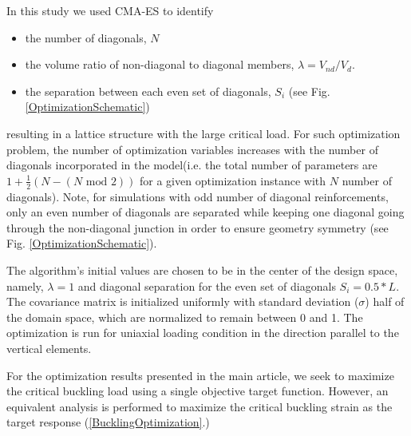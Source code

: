 \documentclass[10pt,twoside]{fernandes_supp}
\begin{document}
In this study we used CMA-ES to identify \begin{itemize} 
\item the number of diagonals, $N$
\item the volume ratio  of non-diagonal to diagonal members, $\lambda=V_{nd}/V_{d}$.
\item  the separation between each even set of diagonals, $S_i$ (see Fig. \ref{OptimizationSchematic})
\end{itemize}
resulting in a lattice structure with the large critical load. For such optimization problem, the number of optimization variables increases with the number of diagonals incorporated in the model(i.e. the total number of parameters are $1+ \frac{1}{2}(N - (N \text{ mod } 2))$ for a given optimization instance with $N$ number of diagonals).  Note, for simulations with odd number of diagonal reinforcements, only an even number of diagonals are separated while keeping one diagonal going through the non-diagonal junction in order to ensure geometry symmetry (see Fig. \ref{OptimizationSchematic}). 

The algorithm's initial values are chosen to be in the center of the design space, namely, $\lambda=1$ and diagonal separation for the even set of diagonals $S_i=0.5*L$. The covariance matrix is initialized uniformly with standard deviation ($\sigma$) half of the domain space, which are normalized to remain between 0 and 1. The optimization is run for uniaxial loading condition in the direction parallel to the vertical elements. 

For the optimization results presented in the main article, we seek to maximize the critical buckling load using a single objective target function. However, an equivalent analysis is performed to maximize the critical buckling strain as the target response (\cref{BucklingOptimization}.) 
\end{document}
